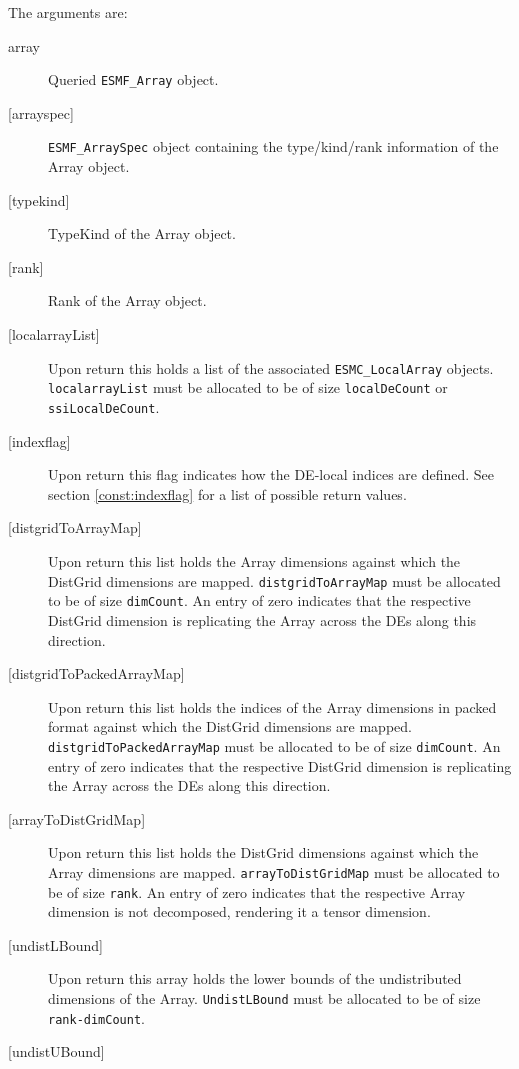    The arguments are:
   \begin{description}
   \item[array]
   Queried {\tt ESMF\_Array} object.
   \item[{[arrayspec]}]
   {\tt ESMF\_ArraySpec} object containing the type/kind/rank information
   of the Array object.
   \item[{[typekind]}]
   TypeKind of the Array object.
   \item[{[rank]}]
   Rank of the Array object.
   \item[{[localarrayList]}]
   Upon return this holds a list of the associated {\tt ESMC\_LocalArray}
   objects. {\tt localarrayList} must be allocated to be of size
   {\tt localDeCount} or {\tt ssiLocalDeCount}.
   \item[{[indexflag]}]
   Upon return this flag indicates how the DE-local indices are defined.
   See section \ref{const:indexflag} for a list of possible return values.
   \item[{[distgridToArrayMap]}]
   Upon return this list holds the Array dimensions against which the
   DistGrid dimensions are mapped. {\tt distgridToArrayMap} must be allocated
   to be of size {\tt dimCount}. An entry of zero indicates that the
   respective DistGrid dimension is replicating the Array across the DEs
   along this direction.
   \item[{[distgridToPackedArrayMap]}]
   Upon return this list holds the indices of the Array dimensions in packed
   format against which the DistGrid dimensions are mapped.
   {\tt distgridToPackedArrayMap} must be allocated to be of size
   {\tt dimCount}. An entry of zero indicates that the respective DistGrid
   dimension is replicating the Array across the DEs along this direction.
   \item[{[arrayToDistGridMap]}]
   Upon return this list holds the DistGrid dimensions against which the
   Array dimensions are mapped. {\tt arrayToDistGridMap} must be allocated
   to be of size {\tt rank}. An entry of zero indicates that the respective
   Array dimension is not decomposed, rendering it a tensor dimension.
   \item[{[undistLBound]}]
   \begin{sloppypar}
   Upon return this array holds the lower bounds of the undistributed
   dimensions of the Array. {\tt UndistLBound} must be allocated to be
   of size {\tt rank-dimCount}.
   \end{sloppypar}
   \item[{[undistUBound]}]

\end{description}
